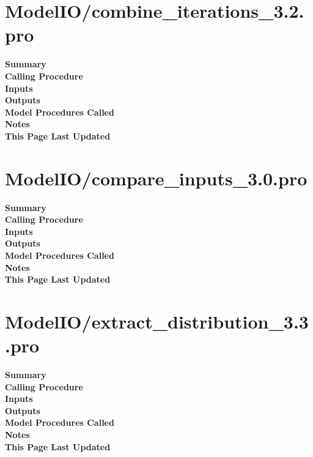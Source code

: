 \documentclass[11pt]{article}
\newcommand\descrip[1]{\textsf{\textbf{\large{#1}}}\\}
\begin{document}
\clearpage

\section{ModelIO/combine\_iterations\_3.2.pro} \label{sec:combine_iterations}

\descrip{Summary}

\descrip{Calling Procedure}

\descrip{Inputs}

\descrip{Outputs}

\descrip{Model Procedures Called}

\descrip{Notes}

\descrip{This Page Last Updated}

\clearpage

\section{ModelIO/compare\_inputs\_3.0.pro} \label{sec:compare_inputs}

\descrip{Summary}

\descrip{Calling Procedure}

\descrip{Inputs}

\descrip{Outputs}

\descrip{Model Procedures Called}

\descrip{Notes}

\descrip{This Page Last Updated}

\clearpage

\section{ModelIO/extract\_distribution\_3.3.pro}
\label{sec:extract_distribution}

\descrip{Summary}

\descrip{Calling Procedure}

\descrip{Inputs}

\descrip{Outputs}

\descrip{Model Procedures Called}

\descrip{Notes}

\descrip{This Page Last Updated}

\clearpage
\end{document}
